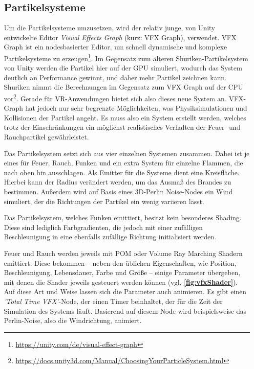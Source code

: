\subsection{Partikelsysteme}
Um die Partikelsysteme umzusetzen, wird der relativ junge, von Unity entwickelte Editor \textit{Visual Effects Graph}
(kurz: VFX Graph), verwendet. VFX Graph ist ein nodesbasierter Editor, um schnell
dynamische und komplexe Partikelsysteme zu erzeugen\footnote{\url{https://unity.com/de/visual-effect-graph}}.
Im Gegensatz zum älteren Shuriken-Partikelsystem von Unity werden die Partikel hier auf der GPU
simuliert, wodurch das System deutlich an Performance gewinnt, und daher mehr Partikel zeichnen kann.
Shuriken nimmt die Berechnungen im Gegensatz zum VFX Graph auf der CPU vor\footnote{\url{https://docs.unity3d.com/Manual/ChoosingYourParticleSystem.html}}.
Gerade für VR-Anwendungen bietet sich also dieses neue System an.
VFX-Graph hat jedoch nur sehr begrenzte Möglichkeiten, was Physiksimulationen und Kollisionen der Partikel angeht.
Es muss also ein System erstellt werden, welches trotz der Einschränkungen ein möglichst realistisches
Verhalten der Feuer- und Rauchpartikel gewährleistet. 

Das Partikelsystem setzt sich aus vier einzelnen Systemen zusammen. Dabei ist je eines für Feuer, Rauch, Funken und ein extra System für einzelne Flammen,
die nach oben hin ausschlagen. Als Emitter für die Systeme dient eine Kreisfläche. Hierbei kann der Radius verändert werden, um das Ausmaß des Brandes
zu bestimmen. Außerdem wird auf Basis eines 3D-Perlin Noise-Nodes ein Wind simuliert, der die Richtungen der Partikel ein wenig variieren lässt.

Das Partikelsystem, welches Funken emittiert, besitzt kein besonderes Shading. Diese sind lediglich Farbgradienten, die jedoch mit einer zufälligen Beschleunigung
in eine ebenfalls zufällige Richtung initialisiert werden. 

Feuer und Rauch werden jeweils mit POM oder Volume Ray Marching Shadern emittiert. Diese bekommen – neben den üblichen Eigenschaften, wie Position, Beschleunigung, Lebensdauer, 
Farbe und Größe – einige Parameter übergeben, mit denen die Shader jeweils gesteuert werden können (vgl. \textbf{\autoref{fig:vfxShader}}). 
Auf diese Art und Weise lassen sich die Parameter auch animieren. Es gibt einen \textit{'Total Time VFX'}-Node, der einen Timer beinhaltet, der für die Zeit der Simulation des Systems läuft.
Basierend auf diesem Node wird beispielsweise das Perlin-Noise, also die Windrichtung, animiert.

